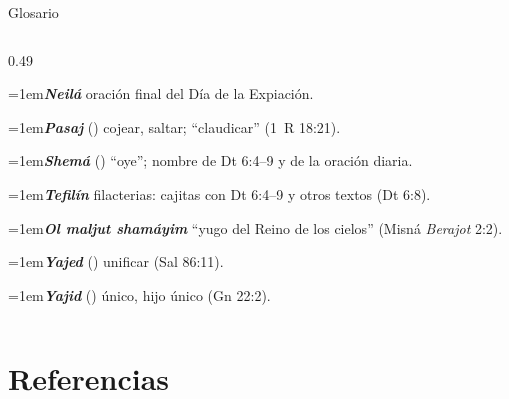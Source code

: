 \begin{frame}{Glosario}
\begin{columns}[t,onlytextwidth]
\begin{column}{0.49\textwidth}
\par\noindent\hangindent=1em{\color{azul}\textbf{\emph{Neilá}}} oración final del Día de la Expiación.\par\vspace{2pt}
\par\noindent\hangindent=1em{\color{azul}\textbf{\emph{Pasaj}}} () cojear, saltar; ``claudicar'' (1~R 18:21).\par\vspace{2pt}
\par\noindent\hangindent=1em{\color{azul}\textbf{\emph{Shemá}}} () ``oye''; nombre de Dt 6:4--9 y de la oración diaria.\par\vspace{2pt}
\par\noindent\hangindent=1em{\color{azul}\textbf{\emph{Tefilín}}} filacterias: cajitas con Dt 6:4--9 y otros textos (Dt 6:8).\par\vspace{2pt}
\par\noindent\hangindent=1em{\color{azul}\textbf{\emph{Ol maljut shamáyim}}} ``yugo del Reino de los cielos'' (Misná \emph{Berajot} 2:2).\par\vspace{2pt}
\par\noindent\hangindent=1em{\color{azul}\textbf{\emph{Yajed}}} () unificar (Sal 86:11).\par\vspace{2pt}
\par\noindent\hangindent=1em{\color{azul}\textbf{\emph{Yajid}}} () único, hijo único (Gn 22:2).\par\vspace{2pt}

\end{column}
\end{columns}
\end{frame}

\section{Referencias}

